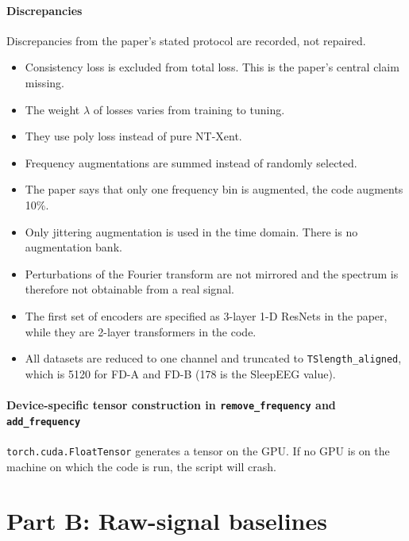 \documentclass[a4paper,11pt]{article}
\newcommand{\code}[1]{\texttt{#1}}
\begin{document}
\paragraph{Discrepancies}
Discrepancies from the paper's stated protocol are recorded, not repaired.
\begin{itemize}
\item Consistency loss is excluded from total loss. This is the paper's central claim missing.
\item The weight $\lambda$ of losses varies from training to tuning.
\item They use poly loss instead of pure NT-Xent.
\item Frequency augmentations are summed instead of randomly selected.
\item The paper says that only one frequency bin is augmented, the code augments 10\%.
\item Only jittering augmentation is used in the time domain. There is no augmentation bank.
\item Perturbations of the Fourier transform are not mirrored and the spectrum is therefore not obtainable from a real signal.
\item The first set of encoders are specified as 3-layer 1-D ResNets in the paper, while they are 2-layer transformers in the code.
\item All datasets are reduced to one channel and truncated to \code{TSlength\_aligned}, which is 5120 for FD-A and FD-B (178 is the SleepEEG value).
\end{itemize}

\paragraph{Device-specific tensor construction in \code{remove\_frequency} and \code{add\_frequency}}
\code{torch.cuda.FloatTensor} generates a tensor on the GPU. If no GPU is on the machine on which the code is run, the script will crash.

\section{Part B: Raw-signal baselines}
\end{document}

